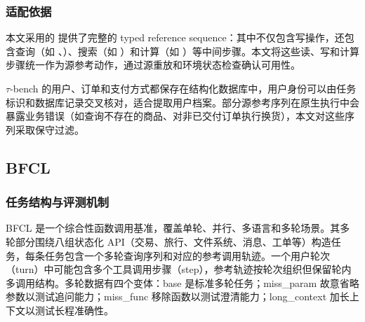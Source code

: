 \subsubsection{适配依据}

本文采用的  提供了完整的 typed reference sequence：其中不仅包含写操作，还包含查询（如 、）、搜索（如 ）和计算（如 ）等中间步骤。本文将这些读、写和计算步骤统一作为源参考动作，通过源重放和环境状态检查确认可用性。

$\tau$-bench 的用户、订单和支付方式都保存在结构化数据库中，用户身份可以由任务标识和数据库记录交叉核对，适合提取用户档案。部分源参考序列在原生执行中会暴露业务错误（如查询不存在的商品、对非已交付订单执行换货），本文对这些序列采取保守过滤。

\subsection{BFCL}

\subsubsection{任务结构与评测机制}

BFCL 是一个综合性函数调用基准，覆盖单轮、并行、多语言和多轮场景\citep{patil2025bfcl}。其多轮部分围绕八组状态化 API（交易、旅行、文件系统、消息、工单等）构造任务，每条任务包含一个多轮查询序列和对应的参考调用轨迹。一个用户轮次（turn）中可能包含多个工具调用步骤（step），参考轨迹按轮次组织但保留轮内多调用结构。多轮数据有四个变体：base 是标准多轮任务；miss\_param 故意省略参数以测试追问能力；miss\_func 移除函数以测试澄清能力；long\_context 加长上下文以测试长程准确性。

